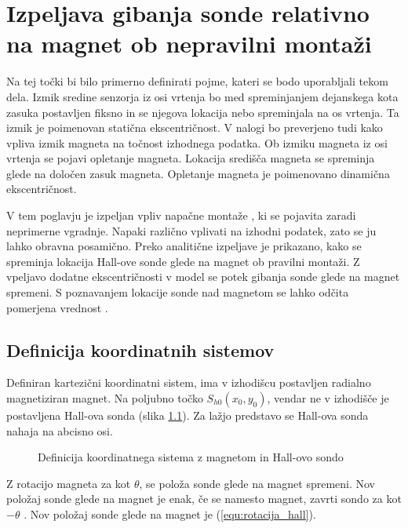 \chapter{Izpeljava gibanja sonde relativno na magnet ob nepravilni montaži}


Na tej točki bi bilo primerno definirati pojme, kateri se bodo uporabljali tekom dela.
Izmik sredine senzorja iz osi vrtenja bo med spreminjanjem dejanskega kota zasuka postavljen fiksno in se njegova lokacija nebo spreminjala na os vrtenja. Ta izmik je poimenovan statična ekscentričnost.
V nalogi bo preverjeno tudi kako vpliva izmik magneta na točnost izhodnega podatka. Ob izmiku magneta iz osi vrtenja se pojavi opletanje magneta. Lokacija središča magneta se spreminja glede na določen zasuk magneta. Opletanje magneta je poimenovano dinamična ekscentričnost.

V tem poglavju je  izpeljan vpliv napačne montaže , ki se pojavita zaradi neprimerne vgradnje. Napaki različno vplivati na izhodni podatek, zato se ju lahko obravna posamično. Preko analitične izpeljave je prikazano, kako se spreminja lokacija Hall-ove sonde glede na magnet ob pravilni montaži. Z vpeljavo dodatne ekscentričnosti v model se potek gibanja sonde glede na magnet spremeni. S poznavanjem lokacije sonde nad magnetom se lahko odčita pomerjena vrednost \Bz.


\section{Definicija koordinatnih sistemov}

Definiran kartezični koordinatni sistem, ima v izhodišcu postavljen radialno magnetiziran magnet. Na poljubno točko $S_{h0}(x_0,y_0)$, vendar ne v izhodišče je postavljena Hall-ova sonda (slika \ref{fig:def_kks}). Za lažjo predstavo se Hall-ova sonda nahaja na abcisno osi.

\begin{figure}[h!]
	\centering
	\caption{Definicija koordinatnega sistema z magnetom in Hall-ovo sondo}
	\label{fig:def_kks}
\end{figure}

Z rotacijo magneta za kot $\theta$, se položa sonde glede na magnet spremeni. Nov položaj sonde glede na magnet je enak, če se namesto magnet, zavrti sondo za kot $-\theta$ . Nov položaj sonde glede na magnet je (\ref{equ:rotacija_hall}).

